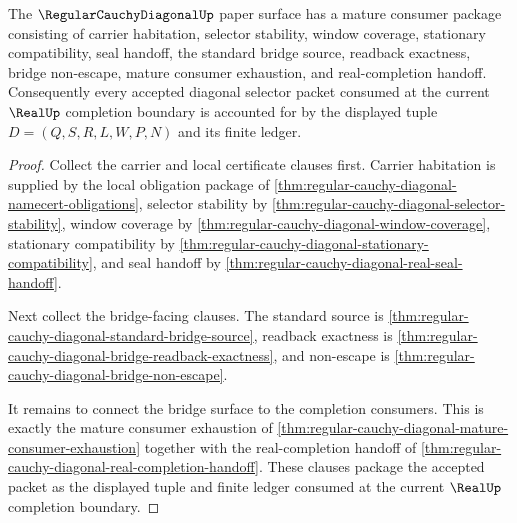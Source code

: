 \begin{theorem}
\label{thm:regular-cauchy-diagonal-mature-closure-certificate}
The $\RegularCauchyDiagonalUp$ paper surface has a mature consumer package consisting of carrier habitation, selector stability, window coverage, stationary compatibility, seal handoff, the standard bridge source, readback exactness, bridge non-escape, mature consumer exhaustion, and real-completion handoff. Consequently every accepted diagonal selector packet consumed at the current $\RealUp$ completion boundary is accounted for by the displayed tuple $D=(Q,S,R,L,W,P,N)$ and its finite ledger.
\end{theorem}
\begin{proof}
Collect the carrier and local certificate clauses first. Carrier habitation is supplied by the local obligation package of \autoref{thm:regular-cauchy-diagonal-namecert-obligations}, selector stability by \autoref{thm:regular-cauchy-diagonal-selector-stability}, window coverage by \autoref{thm:regular-cauchy-diagonal-window-coverage}, stationary compatibility by \autoref{thm:regular-cauchy-diagonal-stationary-compatibility}, and seal handoff by \autoref{thm:regular-cauchy-diagonal-real-seal-handoff}.

Next collect the bridge-facing clauses. The standard source is \autoref{thm:regular-cauchy-diagonal-standard-bridge-source}, readback exactness is \autoref{thm:regular-cauchy-diagonal-bridge-readback-exactness}, and non-escape is \autoref{thm:regular-cauchy-diagonal-bridge-non-escape}.

It remains to connect the bridge surface to the completion consumers. This is exactly the mature consumer exhaustion of \autoref{thm:regular-cauchy-diagonal-mature-consumer-exhaustion} together with the real-completion handoff of \autoref{thm:regular-cauchy-diagonal-real-completion-handoff}. These clauses package the accepted packet as the displayed tuple and finite ledger consumed at the current $\RealUp$ completion boundary.
\end{proof}

